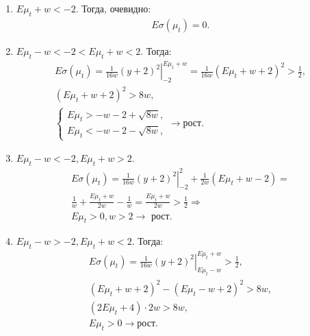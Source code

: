 \documentclass[12pt, twoside]{article}
\begin{document}
\begin{enumerate}
  \item $E \mu_t + w < -2$. Тогда, очевидно:
    \begin{gather*}
      E\sigma(\mu_t) = 0.
    \end{gather*}

  \item $E\mu_t - w < -2 < E\mu_t + w < 2$. Тогда:
    \begin{gather*}
      E\sigma(\mu_t) = \left. \frac{1}{16w} (y+2)^2 \right|_{-2}^{E\mu_t + w} = 
      \frac{1}{16w} (E\mu_t + w + 2)^2 > \frac{1}{2}, \\
      (E\mu_t + w + 2)^2 > 8w, \\
    \begin{cases}
      E\mu_t > -w - 2 + \sqrt{8w}, \\
      E\mu_t < -w - 2 - \sqrt{8w}, 
    \end{cases} \to \text{рост}.
    \end{gather*}

  \item $E\mu_t - w < -2, E\mu_t + w > 2$. 
    \begin{gather*}
      E\sigma(\mu_t) = \left. \frac{1}{16 w} (y+2)^2 \right|_{-2}^{2} + \frac{1}{2 w}(E\mu_t + w -2) = \\
      \frac{1}{w} + \frac{E\mu_t+w}{2w} - \frac{1}{w} = \frac{E\mu_t + w}{2 w} > \frac{1}{2} \Rightarrow \\
      E\mu_t > 0, w > 2 \to \text{ рост}.
    \end{gather*}
  
  \item $E\mu_t - w > -2, E\mu_t + w < 2$. Тогда:
    \begin{gather*}
      E\sigma(\mu_t) = \left. \frac{1}{16 w} (y+2)^2 \right|_{E\mu_t - w}^{E\mu_t + w} > \frac{1}{2},\\
      (E\mu_t + w + 2)^2 - (E\mu_t - w + 2)^2 > 8w,\\
      (2 E\mu_t + 4) \cdot 2w > 8w,\\
      E \mu_t  > 0 \to \text{рост}. 
    \end{gather*}
  

\end{enumerate}
\end{document}
